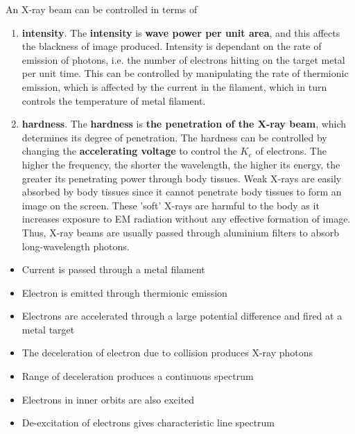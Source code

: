 \documentclass{article}
\begin{document}
An X-ray beam can be controlled in terms of 
\begin{enumerate}
    \item \textbf{intensity}. The \textbf{intensity} is \textbf{wave power per unit area}, and this affects the blackness of image produced. Intensity is dependant on the rate of emission of photons, i.e. the number of electrons hitting on the target metal per unit time. This can be controlled by manipulating the rate of thermionic emission, which is affected by the current in the filament, which in turn controls the temperature of metal filament.   
    \item  \textbf{hardness}. The \textbf{hardness} is \textbf{the penetration of the X-ray beam}, which determines its degree of penetration. The hardness can be controlled by changing the \textbf{accelerating voltage} to control the $K_e$ of electrons. The higher the frequency, the shorter the wavelength, the higher its energy, the greater its penetrating power through body tissues. Weak X-rays are easily absorbed by body tissues since it cannot penetrate body tissues to form an image on the screen. These 'soft' X-rays are harmful to the body as it increases exposure to EM radiation without any effective formation of image. Thus, X-ray beams are usually passed through aluminium filters to absorb long-wavelength photons.
\end{enumerate}

\begin{tcolorbox}[colframe=black!20!white,title=\color{red}{****Explain the principles of production of X-ray beam. (5-6m)}]
\begin{itemize}
\color{red}
    \item Current is passed through a metal filament
    \item Electron is emitted through thermionic emission
    \item Electrons are accelerated through a large potential difference and fired at a metal target
    \item The deceleration of electron due to collision produces X-ray photons
    \item Range of deceleration produces a continuous spectrum 
    \item Electrons in inner orbits are also excited 
    \item De-excitation of electrons gives characteristic line spectrum
\end{itemize}
\end{tcolorbox}
\end{document}
